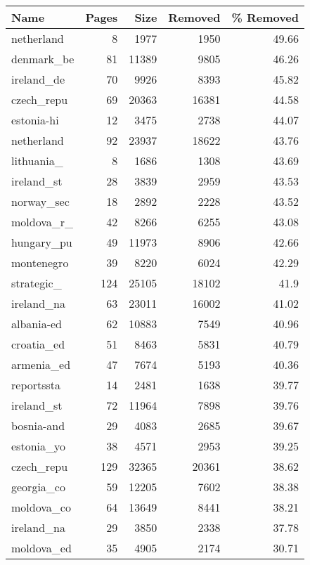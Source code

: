 \begin{tabular}{lrrrr}
\hline
 Name       &   Pages &   Size &   Removed &   \% Removed \\
\hline
 netherland &       8 &   1977 &      1950 &       49.66 \\
 denmark\_be &      81 &  11389 &      9805 &       46.26 \\
 ireland\_de &      70 &   9926 &      8393 &       45.82 \\
 czech\_repu &      69 &  20363 &     16381 &       44.58 \\
 estonia-hi &      12 &   3475 &      2738 &       44.07 \\
 netherland &      92 &  23937 &     18622 &       43.76 \\
 lithuania\_ &       8 &   1686 &      1308 &       43.69 \\
 ireland\_st &      28 &   3839 &      2959 &       43.53 \\
 norway\_sec &      18 &   2892 &      2228 &       43.52 \\
 moldova\_r\_ &      42 &   8266 &      6255 &       43.08 \\
 hungary\_pu &      49 &  11973 &      8906 &       42.66 \\
 montenegro &      39 &   8220 &      6024 &       42.29 \\
 strategic\_ &     124 &  25105 &     18102 &       41.9  \\
 ireland\_na &      63 &  23011 &     16002 &       41.02 \\
 albania-ed &      62 &  10883 &      7549 &       40.96 \\
 croatia\_ed &      51 &   8463 &      5831 &       40.79 \\
 armenia\_ed &      47 &   7674 &      5193 &       40.36 \\
 reportssta &      14 &   2481 &      1638 &       39.77 \\
 ireland\_st &      72 &  11964 &      7898 &       39.76 \\
 bosnia-and &      29 &   4083 &      2685 &       39.67 \\
 estonia\_yo &      38 &   4571 &      2953 &       39.25 \\
 czech\_repu &     129 &  32365 &     20361 &       38.62 \\
 georgia\_co &      59 &  12205 &      7602 &       38.38 \\
 moldova\_co &      64 &  13649 &      8441 &       38.21 \\
 ireland\_na &      29 &   3850 &      2338 &       37.78 \\
 moldova\_ed &      35 &   4905 &      2174 &       30.71 \\
\hline
\end{tabular}